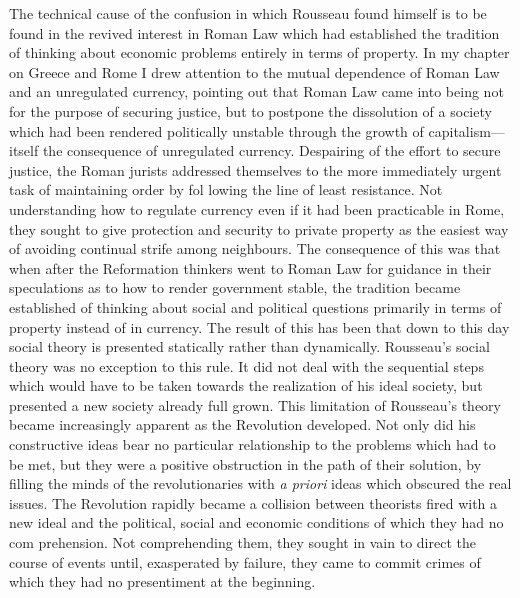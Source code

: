 \documentclass{book}
\begin{document}
The technical cause of the confusion in which Rousseau found himself is to be found in the revived interest in Roman Law which had established the tradition of thinking about economic problems entirely in terms of property. In my chapter on Greece and Rome I drew attention to the mutual dependence of Roman Law and an unregulated currency, pointing out that Roman Law came into being not for the purpose of securing justice, but to postpone the dissolution of a society which had been rendered politically unstable through the growth of capitalism—itself the consequence of unregulated currency. Despairing of the effort to secure justice, the Roman jurists addressed themselves to the more immediately urgent task of maintaining order by fol lowing the line of least resistance. Not understanding how to regulate currency even if it had been practicable in Rome, they sought to give protection and security to private property as the easiest way of avoiding continual strife among neighbours. The consequence of this was that when after the Reformation thinkers went to Roman Law for guidance in their speculations as to how to render government stable, the tradition became established of thinking about social and political questions primarily in terms of property instead of in currency. The result of this has been that down to this day social theory is presented statically rather than dynamically. Rousseau’s social theory was no exception to this rule. It did not deal with the sequential steps which would have to be taken towards the realization of his ideal society, but presented a new society already full grown. This limitation of Rousseau’s theory became increasingly apparent as the Revolution developed. Not only did his constructive ideas bear no particular relationship to the problems which had to be met, but they were a positive obstruction in the path of their solution, by filling the minds of the revolutionaries with \emph{a priori} ideas which obscured the real issues. The Revolution rapidly became a collision between theorists fired with a new ideal and the political, social and economic conditions of which they had no com prehension. Not comprehending them, they sought in vain to direct the course of events until, exasperated by failure, they came to commit crimes of which they had no presentiment at the beginning.
\end{document}
